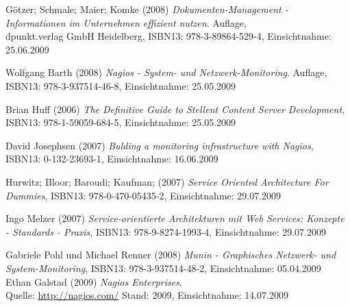 \documentclass[12pt, a4paper, headsepline]{article}
\newcommand{\pictext}[1]{\glqq\textit{#1}\grqq }
\begin{document}

\begin{thebibliography}{xxxxxxxxxx}

	 Götzer; Schmale; Maier; Komke (2008) \pictext{Dokumenten-Management - Informationen im Unternehmen effizient nutzen} 4. Auflage,\\
	 dpunkt.verlag GmbH Heidelberg,  
	 ISBN13: 978-3-89864-529-4, Einsichtnahme: 25.06.2009

	 Wolfgang Barth (2008) \pictext{Nagios - System- und Netzwerk-Monitoring} 2. Auflage, \\
	 ISBN13: 978-3-937514-46-8, Einsichtnahme: 25.05.2009
	 
	 Brian Huff (2006) \pictext{The Definitive Guide to Stellent Content Server Development}, \newline ISBN13: 978-1-59059-684-5, Einsichtnahme: 25.05.2009

	 David Josephsen (2007) \pictext{Bulding a monitoring infrastructure with Nagios}, \newline ISBN13: 0-132-23693-1, Einsichtnahme: 16.06.2009

	 Hurwitz; Bloor; Baroudi; Kaufman; (2007) \pictext{Service Oriented Architecture For Dummies}, \newline ISBN13: 978-0-470-05435-2, Einsichtnahme: 29.07.2009
	 
		 Ingo Melzer (2007) \pictext{Service-orientierte Architekturen mit Web Services: Konzepte - Standards - Praxis}, \newline ISBN13: 978-9-8274-1993-4, Einsichtnahme: 29.07.2009	 
		 
		 	  Gabriele Pohl und Michael Renner (2008) 
	 \pictext{Munin - Graphisches Netzwerk- und System-Monitoring}, \newline ISBN13: 978-3-937514-48-2, Einsichtnahme: 05.04.2009\\	
	 	
	 	 	 	  Ethan Galstad (2009) \pictext{Nagios Enterprises}, \\ Quelle: \url{http://nagios.com/} \newline Stand: 2009, Einsichtnahme: 14.07.2009
 	

\end{thebibliography}
\end{document}
